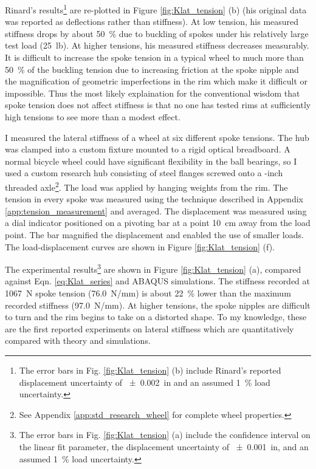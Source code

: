 \documentclass[\rootdir/thesis.tex]{subfiles}
\begin{document}
Rinard's results\footnote{The error bars in Fig. \ref{fig:Klat_tension} (b) include Rinard's reported displacement uncertainty of \SI{+-0.002}{in} and an assumed \SI{1}{\percent} load uncertainty.} are re-plotted in Figure \ref{fig:Klat_tension} (b) (his original data was reported as deflections rather than stiffness). At low tension, his measured stiffness drops by about \SI{50}{\percent} due to buckling of spokes under his relatively large test load (\SI{25}{lb}). At higher tensions, his measured stiffness decreases measurably. It is difficult to increase the spoke tension in a typical wheel to much more than \SI{50}{\percent} of the buckling tension due to increasing friction at the spoke nipple and the magnification of geometric imperfections in the rim which make it difficult or impossible. Thus the most likely explaination for the conventional wisdom that spoke tension does not affect stiffness is that no one has tested rims at sufficiently high tensions to see more than a modest effect.

I measured the lateral stiffness of a wheel at six different spoke tensions. The hub was clamped into a custom fixture mounted to a rigid optical breadboard. A normal bicycle wheel could have significant flexibility in the ball bearings, so I used a custom research hub consisting of steel flanges screwed onto a -inch threaded axle\footnote{See Appendix \ref{app:std_research_wheel} for complete wheel properties.}. The load was applied by hanging weights from the rim. The tension in every spoke was measured using the technique described in Appendix \ref{app:tension_measurement} and averaged. The displacement was measured using a dial indicator positioned on a pivoting bar at a point \SI{10}{cm} away from the load point. The bar magnified the displacement and enabled the use of smaller loads. The load-displacement curves are shown in Figure \ref{fig:Klat_tension} (f).

The experimental results\footnote{The error bars in Fig. \ref{fig:Klat_tension} (a) include the confidence interval on the linear fit parameter, the displacement uncertainty of \SI{+-0.001}{in}, and an assumed \SI{1}{\percent} load uncertainty.} are shown in Figure \ref{fig:Klat_tension} (a), compared against Eqn. \eqref{eq:Klat_series} and ABAQUS simulations. The stiffness recorded at \SI{1067}{N} spoke tension (\SI{76.0}{N/mm}) is about \SI{22}{\percent} lower than the maximum recorded stiffness (\SI{97.0}{N/mm}). At higher tensions, the spoke nipples are difficult to turn and the rim begins to take on a distorted shape. To my knowledge, these are the first reported experiments on lateral stiffness which are quantitatively compared with theory and simulations.
\end{document}
